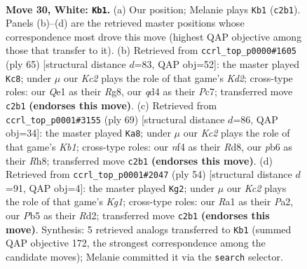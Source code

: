 \documentclass[11pt]{article}
\begin{document}
\clearpage

\begin{figure}[p]\centering
\begin{subfigure}{0.46\textwidth}\centering
\resizebox{\linewidth}{!}{%
\newchessgame
\chessboard[
  setfen={r1r5/n3k3/1p2p3/pP3pN1/3q1n1p/7P/P1K3P1/R3Q2R w - - 2 30},
  showmover=false,
  pgfstyle=straightmove, color=movearrow, markmove={c2-b1}
]}
\caption{}
\end{subfigure}\hfill
\begin{subfigure}{0.46\textwidth}\centering
\resizebox{\linewidth}{!}{%
\newchessgame
\chessboard[
  setfen={6rr/2pk1p2/4p3/1Q2P2p/4PN2/1P6/P1q3PP/5RK1 b - - 1 33},
  showmover=false,
  pgfstyle=straightmove, color=movearrow, markmove={d7-c8}
]}
\caption{}
\end{subfigure}
\\[4pt]
\begin{subfigure}{0.46\textwidth}\centering
\resizebox{\linewidth}{!}{%
\newchessgame
\chessboard[
  setfen={1k1r3r/1pnN1pp1/p7/1P1pP3/8/1q6/1P3QP1/1K2R2R b - - 3 35},
  showmover=false,
  pgfstyle=straightmove, color=movearrow, markmove={b8-a8}
]}
\caption{}
\end{subfigure}\hfill
\begin{subfigure}{0.46\textwidth}\centering
\resizebox{\linewidth}{!}{%
\newchessgame
\chessboard[
  setfen={r2r2k1/6p1/2qpp2p/2n1p3/2Q1P2P/2P1NPP1/P2R4/3R2K1 w - - 2 28},
  showmover=false,
  pgfstyle=straightmove, color=movearrow, markmove={g1-g2}
]}
\caption{}
\end{subfigure}
\caption{\textbf{Move 30, White: \texttt{Kb1}.} (a) Our position; Melanie plays \texttt{Kb1} (\texttt{c2b1}). Panels (b)--(d) are the retrieved master positions whose correspondence most drove this move (highest QAP objective among those that transfer to it). (b) Retrieved from \texttt{ccrl\_top\_p0000\#1605} (ply 65) [structural distance $d$=83, QAP obj=52]: the master played \texttt{Kc8}; under $\mu$ our \emph{Kc2} plays the role of that game's \emph{Kd2}; cross-type roles: our \emph{Q}e1 as their \emph{R}g8, our \emph{q}d4 as their \emph{P}c7; transferred move \texttt{c2b1} \textbf{(endorses this move)}. (c) Retrieved from \texttt{ccrl\_top\_p0001\#3155} (ply 69) [structural distance $d$=86, QAP obj=34]: the master played \texttt{Ka8}; under $\mu$ our \emph{Kc2} plays the role of that game's \emph{Kb1}; cross-type roles: our \emph{n}f4 as their \emph{R}d8, our \emph{p}b6 as their \emph{R}h8; transferred move \texttt{c2b1} \textbf{(endorses this move)}. (d) Retrieved from \texttt{ccrl\_top\_p0001\#2047} (ply 54) [structural distance $d$=91, QAP obj=4]: the master played \texttt{Kg2}; under $\mu$ our \emph{Kc2} plays the role of that game's \emph{Kg1}; cross-type roles: our \emph{R}a1 as their \emph{P}a2, our \emph{P}b5 as their \emph{R}d2; transferred move \texttt{c2b1} \textbf{(endorses this move)}. Synthesis: 5 retrieved analogs transferred to \texttt{Kb1} (summed QAP objective 172, the strongest correspondence among the candidate moves); Melanie committed it via the \texttt{search} selector.}
\label{fig:thought-m58}
\end{figure}
\end{document}
